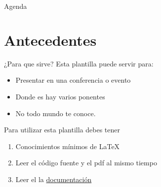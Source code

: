 \begin{frame}{}
    \maketitle
\end{frame}

\begin{frame}{Agenda}
    \begin{multicols}{2}
        \tableofcontents
    \end{multicols}
\end{frame}

\section{Antecedentes}
 \begin{frame}{¿Para que sirve?}
     Esta plantilla puede servir para:
     \begin{itemize}
         \item Presentar en una conferencia o evento
         \item Donde es hay varios ponentes
         \item No todo mundo te conoce.
     \end{itemize}
% 
     \vspace{0.4cm} %
%     
     Para utilizar esta plantilla debes tener
     \begin{enumerate}
         \item Conocimientos mínimos de \LaTeX{}
         \item Leer el código fuente y el pdf al mismo tiempo
         \item Leer el la \href{https://github.com/nemediano/latexPlantillaUnam/blob/main/Notas/README.md}{documentación}
     \end{enumerate}
% 
     \vspace{0.2cm}

 \end{frame}


